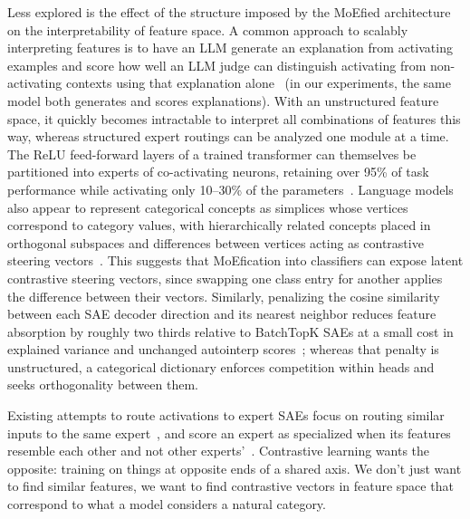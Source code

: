 Less explored is the effect of the structure imposed by the MoEfied
architecture on the interpretability of feature space. A common approach
to scalably interpreting features is to have an LLM generate an
explanation from activating examples and score how well an LLM judge can
distinguish activating from non-activating contexts using that
explanation alone~\cite{paulo2025} (in our experiments, the same model
both generates and scores explanations). With an unstructured feature
space, it quickly becomes intractable to interpret all combinations of
features this way, whereas structured expert routings can be analyzed one
module at a time. The ReLU feed-forward layers of a trained transformer
can themselves be partitioned into experts of co-activating neurons,
retaining over 95\% of task performance while activating only 10--30\% of
the parameters~\cite{zhang2022}. Language models also appear to represent
categorical concepts as simplices whose vertices correspond to category
values, with hierarchically related concepts placed in orthogonal
subspaces and differences between vertices acting as contrastive steering
vectors~\cite{park2025}. This suggests that MoEfication into classifiers
can expose latent contrastive steering vectors, since swapping one class
entry for another applies the difference between their vectors. Similarly,
penalizing the cosine similarity between each SAE decoder direction and
its nearest neighbor reduces feature absorption by roughly two thirds
relative to BatchTopK SAEs at a small cost in explained variance and
unchanged autointerp scores~\cite{korznikov2025}; whereas that penalty is
unstructured, a categorical dictionary enforces competition within heads
and seeks orthogonality between them.

Existing attempts to route activations to expert SAEs focus on routing
similar inputs to the same expert~\cite{mudide2025}, and score an expert
as specialized when its features resemble each other and not other
experts'~\cite{xu2025redundancydiversespecializedmultiexpert}.
Contrastive learning wants the
opposite: training on things at opposite ends of a shared axis. We don't
just want to find similar features, we want to find contrastive vectors
in feature space that correspond to what a model considers a natural
category.

